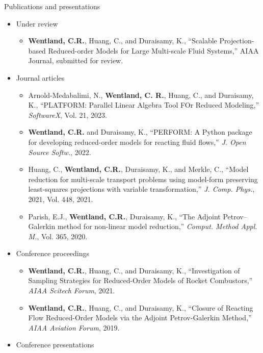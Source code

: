 \documentclass[]{beamer}
\begin{document}
\begin{frame}{Publications and presentations}
	\begin{itemize}
		\item Under review
		\vspace{0.5em}
		\begin{itemize}
			\item \tiny \textbf{Wentland, C.R.}, Huang, C., and Duraisamy, K., ``Scalable Projection-based Reduced-order Models for Large Multi-scale Fluid Systems,'' AIAA Journal, submitted for review.
		\end{itemize}
		\item \normalsize Journal articles
		\vspace{0.5em}
		\begin{itemize}
			\item \tiny Arnold-Medabalimi, N., \textbf{Wentland, C. R.}, Huang, C., and Duraisamy, K., ``PLATFORM: Parallel Linear Algebra Tool FOr
			Reduced Modeling,'' \textit{SoftwareX}, Vol. 21, 2023.
			\item \textbf{Wentland, C.R.} and Duraisamy, K., ``PERFORM: A Python package for developing reduced-order models for reacting fluid flows,'' \textit{J. Open Source Softw.}, 2022.
			\item Huang, C., \textbf{Wentland, C.R.}, Duraisamy, K., and Merkle, C., ``Model reduction for multi-scale transport problems using model-form preserving least-squares projections with variable transformation,'' \textit{J. Comp. Phys.}, 2021, Vol. 448, 2021.
        	\item Parish, E.J., \textbf{Wentland, C.R.}, Duraisamy, K., ``The Adjoint Petrov--Galerkin method for non-linear model reduction,'' \textit{Comput. Method Appl. M.}, Vol. 365, 2020.
		\end{itemize}
		\item \normalsize Conference proceedings
		\vspace{0.5em}
		\begin{itemize}
			\item \tiny \textbf{Wentland, C.R.}, Huang, C., and Duraisamy, K., ``Investigation of Sampling Strategies for Reduced-Order Models of Rocket Combustors,'' \textit{AIAA Scitech Forum}, 2021.
			\item \textbf{Wentland, C.R.}, Huang, C., and Duraisamy, K., ``Closure of Reacting Flow Reduced-Order Models via the Adjoint Petrov-Galerkin Method,'' \textit{AIAA Aviation Forum}, 2019.
		\end{itemize}
		\item \normalsize Conference presentations

\end{itemize}
\end{frame}
\end{document}
